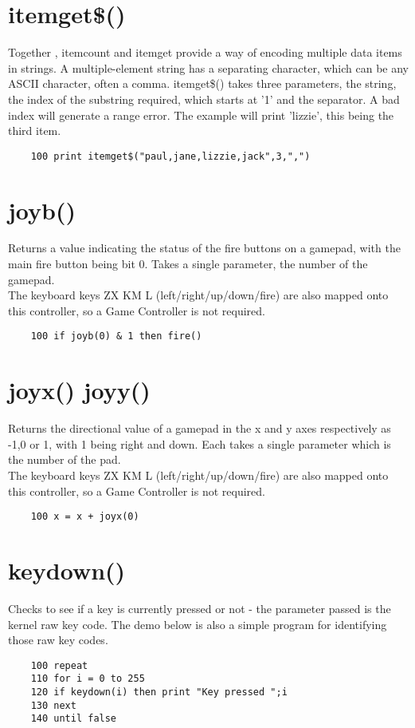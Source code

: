 \section*{itemget\$()}
Together , itemcount and itemget provide a way of encoding multiple data items in strings. A multiple-element string has a separating character, which can be any ASCII character, often a comma.  itemget\$() takes three parameters, the string, the index of the substring required, which starts at '1' and the separator. A bad index will generate a range error.
The example will print 'lizzie', this being the third item.
\example{}
\begin{verbatim}
	100 print itemget$("paul,jane,lizzie,jack",3,",")
\end{verbatim}


\section*{joyb()}
Returns a value indicating the status of the fire buttons on a gamepad, with the main fire button being bit 0. Takes a single parameter, the number of the gamepad.\\

The keyboard keys ZX KM L (left/right/up/down/fire) are also mapped onto this controller, so a Game Controller is not required.

\example{}
\begin{verbatim}
	100 if joyb(0) & 1 then fire()
\end{verbatim}

\section*{joyx() joyy()}
Returns the directional value of a gamepad in the x and y axes respectively as -1,0 or 1, with 1 being right and down. Each takes a single parameter which is the number of the pad.\\

The keyboard keys ZX KM L (left/right/up/down/fire) are also mapped onto this controller, so a Game Controller is not required.

\example{}
\begin{verbatim}
	100 x = x + joyx(0)
\end{verbatim}

\section*{keydown()}
Checks to see if a key is currently pressed or not - the parameter passed is the kernel raw key code. The demo below is also a simple program for identifying those raw key codes.
\example{}
\begin{verbatim}
	100 repeat
	110 for i = 0 to 255
	120 if keydown(i) then print "Key pressed ";i
	130 next
	140 until false
\end{verbatim}


